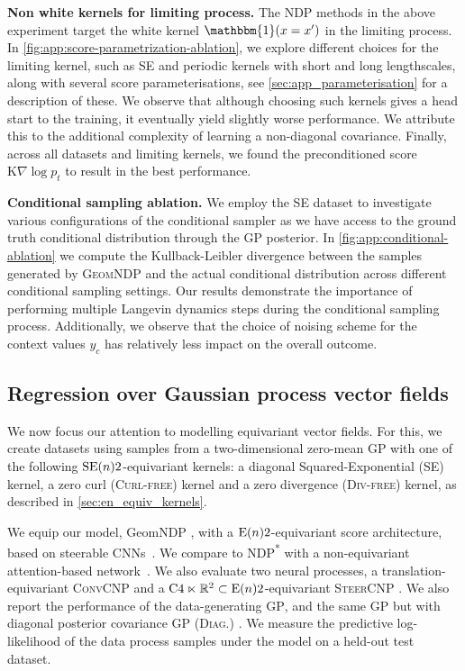 \textbf{Non white kernels for limiting process.}
The NDP methods in the above experiment target the white kernel \(\mathbbm{1}(x = x')\) in the limiting process.
In \cref{fig:app:score-parametrization-ablation}, we explore different choices for the limiting kernel, such as SE and periodic kernels with short and long lengthscales, along with several score parameterisations, see \cref{sec:app_parameterisation} for a description of these.
We observe that although choosing such kernels gives a head start to the training, it eventually yield slightly worse performance.
We attribute this to the additional complexity of learning a non-diagonal covariance.
Finally, across all datasets and limiting kernels, we found the preconditioned score \(\mathrm{K}\nabla \log p_t\) to result in the best performance.

\textbf{Conditional sampling ablation.}
We employ the SE dataset to investigate various configurations of the conditional sampler as we have access to the ground truth conditional distribution through the GP posterior.
In \cref{fig:app:conditional-ablation} we compute the Kullback-Leibler divergence between the samples generated by {\scshape GeomNDP } and the actual conditional distribution across different conditional sampling settings.
Our results demonstrate the importance of performing multiple Langevin dynamics steps during the conditional sampling process.
Additionally, we observe that the choice of noising scheme for the context values \(y_c\) has relatively less impact on the overall outcome.

\subsection{Regression over Gaussian process vector fields}
\label{sec:vec_gp}
We now focus our attention to modelling equivariant vector fields.
For this, we create datasets using samples from a two-dimensional zero-mean GP with one of the following \(\mathrm{SE}(n){2}\)-equivariant kernels: a diagonal Squared-Exponential ({\scshape SE}) kernel, a zero curl ({\scshape Curl-free}) kernel and a zero divergence ({\scshape Div-free}) kernel, as described in \cref{sec:en_equiv_kernels}.

We equip our model, GeomNDP \!
\!\!, with a \(\mathrm{E}(n){2}\)-equivariant score architecture, based on steerable CNNs~\parencite{thomas2018tensor,weiler2021General}.
We compare to {\scshape NDP\textsuperscript{*}} with a non-equivariant attention-based network~\parencite{dutordoir2022Neural}.
We also evaluate two neural processes, a translation-equivariant {\scshape ConvCNP} \parencite{gordon2019Convolutional} and a \(\mathrm{C}4 \ltimes \mathbb{R}^2 \subset \mathrm{E}(n){2}\)-equivariant {\scshape SteerCNP} \parencite{holderrieth2021equivariant}.
We also report the performance of the data-generating {\scshape GP}, and the same GP but with diagonal posterior covariance {\scshape GP (Diag.)
	}.
We measure the predictive log-likelihood of the data process samples under the model on a held-out test dataset.

